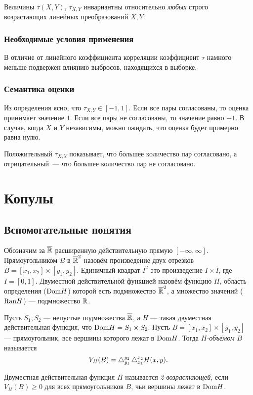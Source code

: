 Величины $\tau(X, Y)$, $\tau_{X, Y}$ инвариантны относительно \emph{любых} строго возрастающих линейных преобразований $X, Y$.

\subsubsection*{Необходимые условия применения}
В отличие от линейного коэффициента корреляции коэффициент $\tau$ намного меньше подвержен влиянию выбросов, находящихся в выборке.
\subsubsection*{Семантика оценки}
Из определения ясно, что $\tau_{X, Y} \in [-1, 1]$. Если все пары согласованы, то оценка принимает значение $1$. Если все пары не согласованы, то значение равно $-1$. В случае, когда $X$ и $Y$ независимы, можно ожидать, что оценка будет примерно равна нулю.

Положительный $\tau_{X, Y}$ показывает, что большее количество пар согласовано, а отрицательный~--- что большее количество пар не согласовано.

\section*{Копулы}

\subsection*{Вспомогательные понятия}

Обозначим за $\overline{\mathbb{R}}$ расширенную действительную прямую $[-\infty, \infty]$. Прямоугольником $B$ в $\overline{\mathbb{R}}^2$ назовём произведение двух отрезков $B = [x_1, x_2] \times [y_1, y_2]$. Единичный квадрат $I^2$ это произведение $I \times I$, где $I = [0, 1]$. Двуместной действительной функцией назовём функцию $H$, область определения ($\mathrm{Dom}{H}$) которой есть подмножество $\overline{\mathbb{R}}^2$, а множество значений ($\mathrm{Ran}{H}$) --- подмножество $\mathbb{R}$.

\begin{define}
	Пусть $S_1, S_2$ --- непустые подмножества $\overline{\mathbb{R}}$, а $H$ --- такая двуместная действительная функция, что $\mathrm{Dom}{H} = S_1 \times S_2$. Пусть $B = [x_1, x_2] \times [y_1, y_2]$ --- прямоугольник, все вершины которого лежат в $\mathrm{Dom}{H}$. Тогда \emph{$H$-объёмом} $B$ называется
\[
V_H(B) = \mathop{}\!\mathbin\bigtriangleup_{y_1}^{y_2}\mathop{}\!\mathbin\bigtriangleup_{x_1}^{x_2}H(x, y).
\]
\end{define}

\begin{define}
	Двуместная действительная функция $H$ называется \emph{2-возрастающей}, если $V_H(B) \geqslant 0$ для всех прямоугольников $B$, чьи вершины лежат в $\mathrm{Dom}{H}$.
\end{define}

